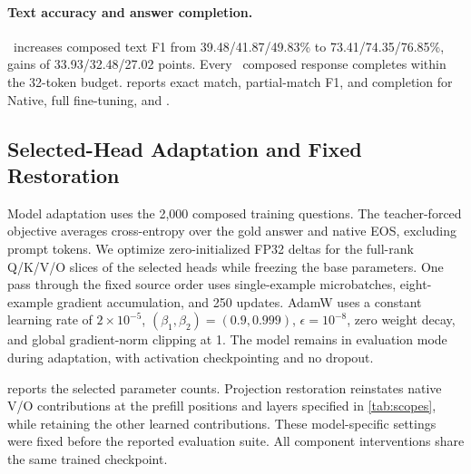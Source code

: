 \paragraph{Text accuracy and answer completion.} \method\ increases composed text F1 from 39.48/41.87/49.83\% to 73.41/74.35/76.85\%, gains of 33.93/32.48/27.02 points. Every \method\ composed response completes within the 32-token budget.  reports exact match, partial-match F1, and completion for Native, full fine-tuning, and \method.

\begin{table}[!htbp]
  \centering
  \caption{Scoring on 1,000 composed test questions (percent; adapted methods averaged over runs). Text EM removes the EOS condition; F1 uses the same aliases.}
  \label{tab:scoring}
  \small
  \setlength{\tabcolsep}{5pt}
  
\end{table}

\subsection{Selected-Head Adaptation and Fixed Restoration}
\label{app:training_protocol}

Model adaptation uses the 2,000 composed training questions. The teacher-forced objective averages cross-entropy over the gold answer and native EOS, excluding prompt tokens. We optimize zero-initialized FP32 deltas for the full-rank Q/K/V/O slices of the selected heads while freezing the base parameters. One pass through the fixed source order uses single-example microbatches, eight-example gradient accumulation, and 250 updates. AdamW \citep{loshchilov2019adamw} uses a constant learning rate of $2\times10^{-5}$, $(\beta_1,\beta_2)=(0.9,0.999)$, $\epsilon=10^{-8}$, zero weight decay, and global gradient-norm clipping at 1. The model remains in evaluation mode during adaptation, with activation checkpointing and no dropout.

 reports the selected parameter counts. Projection restoration reinstates native V/O contributions at the prefill positions and layers specified in \cref{tab:scopes}, while retaining the other learned contributions. These model-specific settings were fixed before the reported evaluation suite. All component interventions share the same trained checkpoint.

\begin{table}[!htbp]
  \centering
  \caption{Selected-head and full-reader sizes. Trainable weights count Q/K/V/O slice deltas; model fractions exclude the separately fitted reader.}
  \label{tab:parameters}
  \small
  \setlength{\tabcolsep}{5pt}
  
\end{table}


